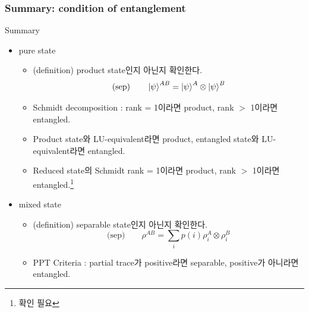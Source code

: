 \documentclass[9pt]{beamer}
\begin{document}
    \begin{frame}
        \frametitle{Summary: condition of entanglement}
        \begin{block}{Summary}
            \begin{itemize}
                \item pure state
                \begin{itemize}
                    \item (definition) product state인지 아닌지 확인한다.
                    \begin{equation*}
                        \text{(sep)} \qquad \ket{\psi}^{AB} = \ket{\psi}^A \otimes \ket{\psi}^B
                    \end{equation*}
                    \item Schmidt decomposition : rank = 1이라면 product, rank $>$ 1이라면 entangled.
                    \item Product state와 LU-equivalent라면 product, entangled state와 LU-equivalent라면 entangled.
                    \item Reduced state의 Schmidt rank = 1이라면 product, rank $>$ 1이라면 entangled.\footnote{확인 필요}
                \end{itemize}
                \item mixed state
                \begin{itemize}
                    \item (definition) separable state인지 아닌지 확인한다.
                        \begin{equation*}
                            \text{(sep)} \qquad \rho^{AB} = \sum_i p(i) \rho_i^A \otimes \rho_i^B
                        \end{equation*}
                    \item PPT Criteria : partial trace가 positive라면 separable, positive가 아니라면 entangled.
                \end{itemize}
            \end{itemize}
        \end{block}
    \end{frame}
\end{document}
